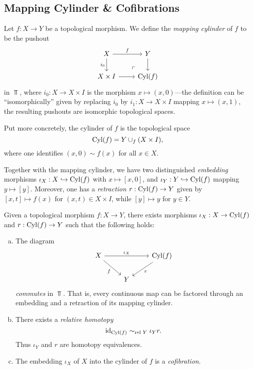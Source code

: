 \subsection{Mapping Cylinder \& Cofibrations}

\begin{definition}
\label{def:mapping-cylinder}
Let \(f: X \to Y\) be a topological morphism. We define the \emph{mapping
  cylinder} of \(f\) to be the pushout
\[
\begin{tikzcd}
X \ar[r, "f"] \ar[d, "i_0"']
\ar[rd, phantom, very near end, "\ulcorner"]
&Y \ar[d] \\
X \times I \ar[r] &\Cyl(f)
\end{tikzcd}
\]
in \(\Top\), where \(i_0: X \to X \times I\) is the morphism
\(x \mapsto (x, 0)\)---the definition can be ``isomorphically'' given by
replacing \(i_0\) by \(i_1: X \to X \times I\) mapping \(x \mapsto (x, 1)\), the
resulting pushouts are isomorphic topological spaces.

Put more concretely, the cylinder of \(f\) is the topological space
\[
\operatorname{Cyl}(f) = Y \cup_f (X \times I),
\]
where one identifies \((x, 0) \sim f(x)\) for all \(x \in X\).

Together with the mapping cylinder, we have two distinguished \emph{embedding}
morphisms \(\iota_X: X \hookrightarrow \operatorname{Cyl}(f)\) with \(x \mapsto [x, 0]\), and
\(\iota_Y: Y \hookrightarrow \operatorname{Cyl}(f)\) mapping \(y \mapsto [y]\). Moreover, one has a
\emph{retraction}  \(r: \operatorname{Cyl}(f) \to Y\) given by \([x, t] \mapsto f(x)\) for
\((x, t) \in X \times I\), while \([y] \mapsto y\) for \(y \in Y\).
\end{definition}

\begin{theorem}
\label{thm:factorization-morphism-embedding-retraction}
Given a topological morphism \(f: X \to Y\), there exists morphisms
\(\iota_X: X \to \operatorname{Cyl}(f)\) and \(r: \operatorname{Cyl}(f) \to Y\) such that the following
holds:
\begin{enumerate}[(a)]\setlength\itemsep{0em}
\item The diagram
  \[
  \begin{tikzcd}
  X \ar[rr, "\iota_X"] \ar[dr, "f"'] & &\Cyl(f) \ar[ld, "r"] \\
  &Y &
  \end{tikzcd}
  \]
  \emph{commutes} in \(\Top\). That is, every continuous map can be factored
  through an embedding and a retraction of its mapping cylinder.

\item There exists a \emph{relative homotopy}
  \[
  \operatorname{id}_{\operatorname{Cyl}(f)} \sim_{\text{rel }{Y}} \iota_Y r.
  \]
  Thus \(\iota_Y\) and \(r\) are homotopy equivalences.

\item The embedding \(\iota_X\) of \(X\) into the cylinder of \(f\) is a
  \emph{cofibration}.
\end{enumerate}
\end{theorem}

